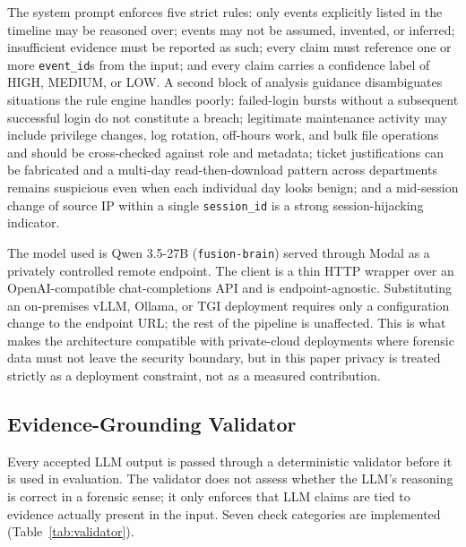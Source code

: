 \documentclass[conference]{IEEEtran}
\begin{document}
The system prompt enforces five strict rules: only events explicitly listed in the timeline may be reasoned over; events may not be assumed, invented, or inferred; insufficient evidence must be reported as such; every claim must reference one or more \texttt{event\_id}s from the input; and every claim carries a confidence label of HIGH, MEDIUM, or LOW. A second block of analysis guidance disambiguates situations the rule engine handles poorly: failed-login bursts without a subsequent successful login do not constitute a breach; legitimate maintenance activity may include privilege changes, log rotation, off-hours work, and bulk file operations and should be cross-checked against role and metadata; ticket justifications can be fabricated and a multi-day read-then-download pattern across departments remains suspicious even when each individual day looks benign; and a mid-session change of source IP within a single \texttt{session\_id} is a strong session-hijacking indicator.

The model used is Qwen 3.5-27B (\texttt{fusion-brain}) served through Modal as a privately controlled remote endpoint. The client is a thin HTTP wrapper over an OpenAI-compatible chat-completions API and is endpoint-agnostic. Substituting an on-premises vLLM, Ollama, or TGI deployment requires only a configuration change to the endpoint URL; the rest of the pipeline is unaffected. This is what makes the architecture compatible with private-cloud deployments where forensic data must not leave the security boundary, but in this paper privacy is treated strictly as a deployment constraint, not as a measured contribution.

\subsection{Evidence-Grounding Validator}
\label{sec:validator}

Every accepted LLM output is passed through a deterministic validator before it is used in evaluation. The validator does not assess whether the LLM's reasoning is correct in a forensic sense; it only enforces that LLM claims are tied to evidence actually present in the input. Seven check categories are implemented (Table~\ref{tab:validator}).
\end{document}
